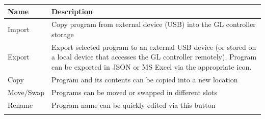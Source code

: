 \begin{longtable}[]{@{}|l|l|@{}}
\toprule
\rowcolor{brown}\begin{minipage}[b]{0.20\columnwidth}\raggedright
{\bf{Name}}\strut
\end{minipage} & \begin{minipage}[b]{0.74\columnwidth}\raggedright
{\bf{Description}}\strut
\end{minipage}\tabularnewline
\midrule
\endhead
\begin{minipage}[t]{0.20\columnwidth}\raggedright
Import\strut
\end{minipage} & \begin{minipage}[t]{0.74\columnwidth}\raggedright
Copy program from external device (USB) into the GL controller
storage\strut
\end{minipage}\tabularnewline
\begin{minipage}[t]{0.20\columnwidth}\raggedright
Export\strut
\end{minipage} & \begin{minipage}[t]{0.74\columnwidth}\raggedright
Export selected program to an external USB device (or stored on a local
device that accesses the GL controller remotely). Program can be
exported in JSON or MS Excel via the appropriate icon.\strut
\end{minipage}\tabularnewline
\begin{minipage}[t]{0.20\columnwidth}\raggedright
Copy\strut
\end{minipage} & \begin{minipage}[t]{0.74\columnwidth}\raggedright
Program and its contents can be copied into a new location\strut
\end{minipage}\tabularnewline
\begin{minipage}[t]{0.20\columnwidth}\raggedright
Move/Swap\strut
\end{minipage} & \begin{minipage}[t]{0.74\columnwidth}\raggedright
Programs can be moved or swapped in different slots\strut
\end{minipage}\tabularnewline
\begin{minipage}[t]{0.20\columnwidth}\raggedright
Rename\strut
\end{minipage} & \begin{minipage}[t]{0.74\columnwidth}\raggedright
Program name can be quickly edited via this button\strut
\end{minipage}\tabularnewline
\begin{minipage}[t]{0.20\columnwidth}\raggedright

\end{minipage}
\end{longtable}
